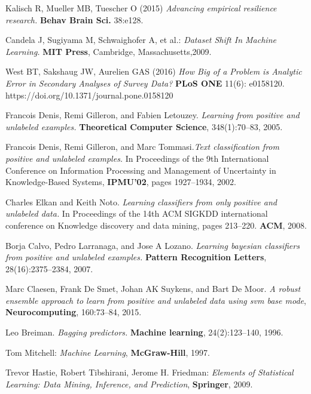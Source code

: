 \begin{thebibliography}{9}

Kalisch R, Mueller MB, Tuescher O (2015) \textit{Advancing empirical resilience research.} \textbf{Behav Brain Sci.} 38:e128.

Candela J, Sugiyama M, Schwaighofer A, et al.: \textit{Dataset Shift In Machine Learning.} \textbf{MIT Press}, Cambridge, Massachusetts,2009.

West BT, Sakshaug JW, Aurelien GAS (2016) \textit{How Big of a Problem is Analytic Error in Secondary Analyses of Survey Data?} \textbf{PLoS ONE} 11(6): e0158120. https://doi.org/10.1371/journal.pone.0158120

 Francois Denis, Remi Gilleron, and Fabien Letouzey. \textit{Learning from positive and unlabeled examples.} \textbf{Theoretical Computer Science}, 348(1):70–83, 2005. 

Francois Denis, Remi Gilleron, and Marc Tommasi.\textit{Text classiﬁcation from positive and unlabeled examples.} In Proceedings of the 9th International Conference on Information Processing and Management of Uncertainty in Knowledge-Based Systems, \textbf{IPMU'02}, pages 1927–1934, 2002.

Charles Elkan and Keith Noto. \textit{Learning classifiers from only positive and unlabeled data.} In Proceedings of the 14th ACM SIGKDD international conference on Knowledge discovery and data mining, pages 213–220. \textbf{ACM}, 2008.

Borja Calvo, Pedro Larranaga, and Jose A Lozano. \textit{Learning bayesian classifiers from positive and unlabeled examples.} \textbf{Pattern Recognition Letters}, 28(16):2375–2384, 2007. 

Marc Claesen, Frank De Smet, Johan AK Suykens, and Bart De Moor. \textit{A robust ensemble approach to learn from positive and unlabeled data using svm base mode}, \textbf{Neurocomputing}, 160:73–84, 2015.

Leo Breiman. \textit{Bagging predictors.} \textbf{Machine learning}, 24(2):123–140, 1996.

Tom Mitchell: \textit{Machine Learning}, \textbf{McGraw-Hill}, 1997.

Trevor Hastie, Robert Tibshirani, Jerome H. Friedman: \textit{Elements of Statistical Learning: Data Mining, Inference, and Prediction}, \textbf{Springer}, 2009.


\end{thebibliography}

